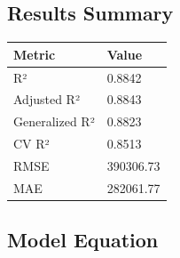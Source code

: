 \documentclass[
]{article}
\begin{document}
\subsection{Results Summary}\label{results-summary}

{\def\LTcaptype{} %
\begin{longtable}[]{@{}ll@{}}
\toprule\noalign{}
Metric & Value \\
\midrule\noalign{}
\endhead
\bottomrule\noalign{}
\endlastfoot
R² & 0.8842 \\
Adjusted R² & 0.8843 \\
Generalized R² & 0.8823 \\
CV R² & 0.8513 \\
RMSE & 390306.73 \\
MAE & 282061.77 \\
\end{longtable}
}

\subsection{Model Equation}\label{model-equation}
\end{document}
